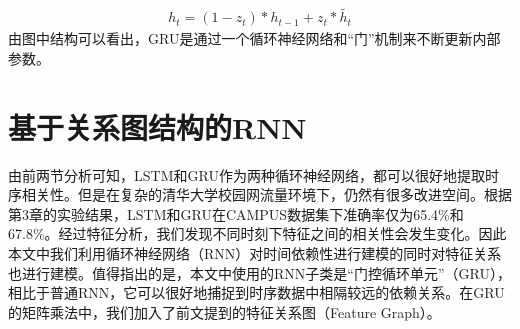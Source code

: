 \begin{equation}
    \begin{aligned}
        h_t = (1- z_t) * h_{t-1} + z_t * \widetilde{h_t}
    \end{aligned}
\end{equation}
由图中结构可以看出，GRU是通过一个循环神经网络和“门”机制来不断更新内部参数。




\section{基于关系图结构的RNN}
由前两节分析可知，LSTM和GRU作为两种循环神经网络，都可以很好地提取时序相关性。但是在复杂的清华大学校园网流量环境下，仍然有很多改进空间。根据第3章的实验结果，LSTM和GRU在CAMPUS数据集下准确率仅为65.4\%和67.8\%。经过特征分析，我们发现不同时刻下特征之间的相关性会发生变化。因此本文中我们利用循环神经网络（RNN）对时间依赖性进行建模的同时对特征关系也进行建模。值得指出的是，本文中使用的RNN子类是“门控循环单元”（GRU），相比于普通RNN，它可以很好地捕捉到时序数据中相隔较远的依赖关系。在GRU的矩阵乘法中，我们加入了前文提到的特征关系图（Feature Graph）。

